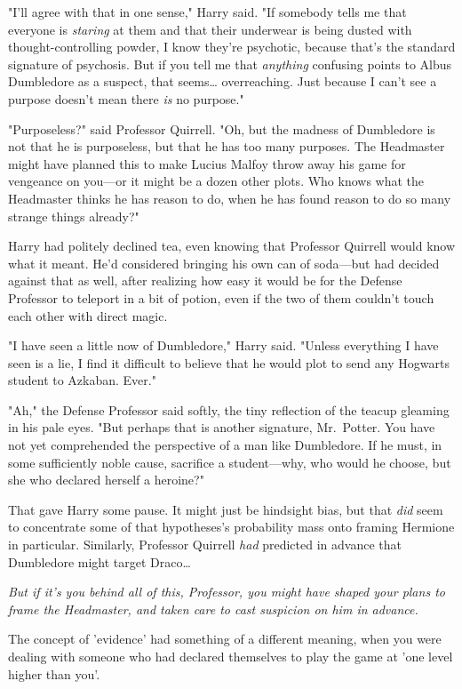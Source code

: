 "I'll agree with that in one sense," Harry said. "If somebody tells me that everyone is \emph{staring} at them and that their underwear is being dusted with thought-controlling powder, I know they're psychotic, because that's the standard signature of psychosis. But if you tell me that \emph{anything} confusing points to Albus Dumbledore as a suspect, that seems{\ldots} overreaching. Just because I can't see a purpose doesn't mean there \emph{is} no purpose."

"Purposeless?" said Professor Quirrell. "Oh, but the madness of Dumbledore is not that he is purposeless, but that he has too many purposes. The Headmaster might have planned this to make Lucius Malfoy throw away his game for vengeance on you---or it might be a dozen other plots. Who knows what the Headmaster thinks he has reason to do, when he has found reason to do so many strange things already?"

Harry had politely declined tea, even knowing that Professor Quirrell would know what it meant. He'd considered bringing his own can of soda---but had decided against that as well, after realizing how easy it would be for the Defense Professor to teleport in a bit of potion, even if the two of them couldn't touch each other with direct magic.

"I have seen a little now of Dumbledore," Harry said. "Unless everything I have seen is a lie, I find it difficult to believe that he would plot to send any Hogwarts student to Azkaban. Ever."

"Ah," the Defense Professor said softly, the tiny reflection of the teacup gleaming in his pale eyes. "But perhaps that is another signature, Mr.~Potter. You have not yet comprehended the perspective of a man like Dumbledore. If he must, in some sufficiently noble cause, sacrifice a student---why, who would he choose, but she who declared herself a heroine?"

That gave Harry some pause. It might just be hindsight bias, but that \emph{did} seem to concentrate some of that hypotheses's probability mass onto framing Hermione in particular. Similarly, Professor Quirrell \emph{had} predicted in advance that Dumbledore might target Draco{\ldots}

\emph{But if it's you behind all of this, Professor, you might have shaped your plans to frame the Headmaster, and taken care to cast suspicion on him in advance.}

The concept of 'evidence' had something of a different meaning, when you were dealing with someone who had declared themselves to play the game at 'one level higher than you'.

